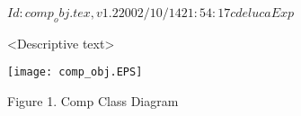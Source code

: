 $Id: comp_obj.tex,v 1.2 2002/10/14 21:54:17 cdeluca Exp $
%


<Descriptive text>

\begin{center}
\texttt{[image: comp\_obj.EPS]}
   
Figure 1.  Comp Class Diagram
   
\end{center}

